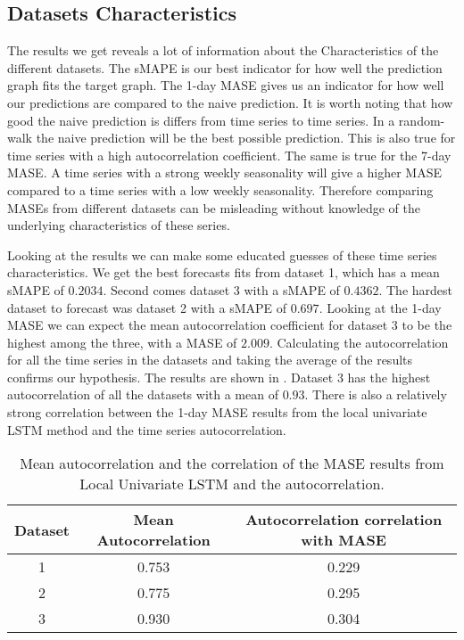 
\subsection{Datasets Characteristics}
The results we get reveals a lot of information about the Characteristics of the different datasets.
The sMAPE is our best indicator for how well the prediction graph fits the target graph.
The 1-day MASE gives us an indicator for how well our predictions are compared to the naive
prediction. It is worth noting that how good the naive prediction is differs from time series
to time series. In a random-walk the naive prediction will be the best possible prediction.
This is also true for time series with a high autocorrelation coefficient.
The same is true for the 7-day MASE. A time series with a strong weekly seasonality will
give a higher MASE compared to a time series with a low weekly seasonality.
Therefore comparing MASEs from different datasets can be misleading without knowledge of
the underlying characteristics of these series.

Looking at the results we can make some educated guesses of these time series characteristics.
We get the best forecasts fits from dataset 1, which has a mean sMAPE of $0.2034$.
Second comes dataset 3 with a sMAPE of $0.4362$. The hardest dataset to forecast was dataset 2 with a
sMAPE of $0.697$. Looking at the 1-day MASE we can expect the mean autocorrelation coefficient for
dataset 3 to be the highest among the three, with a MASE of $2.009$.
Calculating the autocorrelation for all the time series in the datasets and
taking the average of the results confirms our hypothesis. The results are shown in .
Dataset 3 has the highest autocorrelation of all the datasets with a mean
of $0.93$. There is also a relatively strong correlation between the 1-day MASE results
from the local univariate LSTM method and the time series autocorrelation.

\begin{table}[htbp]
  \begin{center}
    \begin{tabular}{|c|c|c|}\hline\hline
      Dataset & Mean Autocorrelation & Autocorrelation correlation with MASE \\\hline
      1       & 0.753                & 0.229                                 \\\hline
      2       & 0.775                & 0.295                                 \\\hline
      3       & 0.930                & 0.304                                 \\\hline
    \end{tabular}
    \caption{Mean autocorrelation and the correlation of the MASE results from Local Univariate LSTM and the autocorrelation.}
  \end{center}
  \label{tab:datasets-autocorrelation}
\end{table}%

